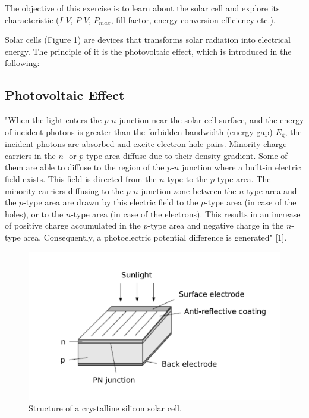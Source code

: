 \documentclass{article}
\begin{document}
The objective of this exercise is to learn about the solar
cell and explore its characteristic ($I$-$V$, $P$-$V$, $P_{max}$, fill factor, energy conversion efficiency etc.).

Solar cells (Figure 1) are devices that transforms solar radiation into electrical energy. The principle of it is the photovoltaic effect, which is introduced in the following:

\subsection*{Photovoltaic Effect}

"When the light enters the $p$-$n$ junction near the solar cell surface, and the energy of incident photons is greater than the forbidden bandwidth (energy gap) $E_\text{g}$, the incident photons are absorbed and excite electron-hole pairs. Minority charge carriers in the $n$- or $p$-type area diffuse due to their density gradient. Some of them are able to diffuse to the region of the $p$-$n$ junction where a built-in electric field exists. This field is directed from the $n$-type to the $p$-type area. The minority carriers diffusing to the $p$-$n$ junction zone between the $n$-type area and the $p$-type area are drawn by this electric field to the $p$-type area (in case of the holes), or to the $n$-type area (in case of the electrons). This results in an increase of positive charge accumulated in the $p$-type area and negative charge in the $n$-type area. Consequently, a photoelectric potential difference is generated" [1].

\begin{figure}[H]\centering
    \includegraphics[scale=0.25]{pn.png}
    \caption{Structure of a crystalline silicon solar cell.}\label{FigPN}
\end{figure}
\end{document}
